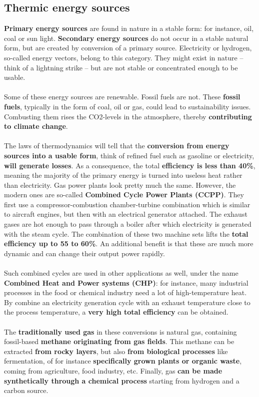 \documentclass[../summary.tex]{subfiles}
\begin{document}
	\subsection{Thermic energy sources}
	
	\textbf{Primary energy sources} are found in nature in a stable form: for instance, oil, coal or sun light. \textbf{Secondary energy sources} do not occur in a stable natural form, but are created by conversion of a primary source. Electricity or hydrogen, so-called energy vectors, belong to this category. They might exist in nature – think of a lightning strike – but are not stable or concentrated enough to be usable.
	\\\\
	Some of these energy sources are renewable. Fossil fuels are not. These \textbf{fossil fuels}, typically in the form of coal, oil or gas, could lead to sustainability issues. Combusting them rises the CO2-levels in the atmosphere, thereby \textbf{contributing to climate change}. 
	\\\\
	The laws of thermodynamics will tell that the \textbf{conversion from energy sources into a usable form}, think of refined fuel such as gasoline or electricity, \textbf{will generate losses}. As a consequence, the total \textbf{efficiency is less than 40\%}, meaning the majority of the primary energy is turned into useless heat rather than electricity. Gas power plants look pretty much the same. However, the modern ones are so-called \textbf{Combined Cycle Power Plants (CCPP)}. They first use a compressor-combustion chamber-turbine combination which is similar to aircraft engines, but then with an electrical generator attached. The exhaust gases are hot enough to pass through a boiler after which electricity is generated with the steam cycle. The combination of these two machine sets lifts the \textbf{total efficiency up to 55 to 60\%}. An additional benefit is that these are much more dynamic and can change their output power rapidly. 
	\\
	\\
	Such combined cycles are used in other applications as well, under the name \textbf{Combined Heat and Power systems (CHP)}: for instance, many industrial processes in the food or chemical industry need a lot of high-temperature heat. By combine an electricity generation cycle with an exhaust temperature close to the process temperature, a \textbf{very high total efficiency} can be obtained.
	\\\\
	The \textbf{traditionally used gas} in these conversions is natural gas, containing fossil-based \textbf{methane originating from gas fields}. This methane can be extracted \textbf{from rocky layers}, but also \textbf{from biological processes} like fermentation, of for instance \textbf{specifically grown plants or organic waste}, coming from agriculture, food industry, etc. Finally, gas \textbf{can be made synthetically through a chemical process} starting from hydrogen and a carbon source.
	
\end{document}
